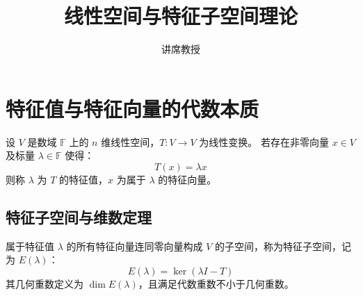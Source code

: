 \documentclass{article}
\title{线性空间与特征子空间理论}
\author{讲席教授}
\begin{document}
\section{特征值与特征向量的代数本质}
设 $V$ 是数域 $\mathbb{F}$ 上的 $n$ 维线性空间，$T: V \to V$ 为线性变换。
若存在非零向量 $x \in V$ 及标量 $\lambda \in \mathbb{F}$ 使得：
\begin{equation}
T(x) = \lambda x
\end{equation}
则称 $\lambda$ 为 $T$ 的特征值，$x$ 为属于 $\lambda$ 的特征向量。

\subsection{特征子空间与维数定理}
属于特征值 $\lambda$ 的所有特征向量连同零向量构成 $V$ 的子空间，称为特征子空间，记为 $E(\lambda)$：
\begin{equation}
E(\lambda) = \ker(\lambda I - T)
\end{equation}
其几何重数定义为 $\dim E(\lambda)$，且满足代数重数不小于几何重数。
\end{document}
